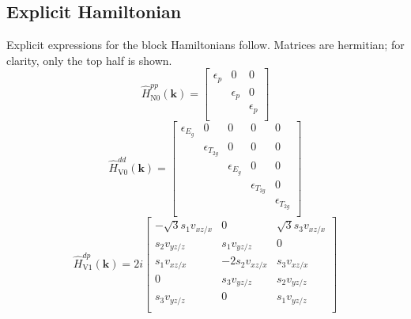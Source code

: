 \documentclass[twocolumn,showpacs,preprintnumbers,superscriptaddress,prb,floatfix,aps,10pt]{revtex4-1}
\renewcommand{\vec}[1]{\ensuremath{\mathbf{#1}}}
\newcommand*{\ham}{\hat{H}}
\begin{document}

\begin{widetext}

\section{Explicit Hamiltonian}

Explicit expressions for the block Hamiltonians follow. Matrices are hermitian; for clarity, only the top half is shown.
%
\begin{equation}
\label{eq:0pp}
\ham_{\textrm{N0}}^{pp}(\vec{k}) =
\begin{bmatrix}
\epsilon_{p} & 0 & 0 \\
  & \epsilon_{p} & 0 \\
  &   & \epsilon_{p} \\
\end{bmatrix}
\end{equation}
%
\begin{equation}
\label{eq:0dd}
\ham_{\textrm{V0}}^{dd}(\vec{k}) =
\begin{bmatrix}
 \epsilon_{E_g} & 0 & 0 & 0 & 0 \\
   & \epsilon_{T_{2g}} & 0 & 0 & 0 \\
   &   & \epsilon_{E_g} & 0 & 0 \\
   &   &   & \epsilon_{T_{2g}} & 0 \\
   &   &   &   & \epsilon_{T_{2g}} \\
\end{bmatrix}
\end{equation}
%
\begin{equation}
\ham_{\textrm{V1}}^{dp}(\vec{k}) = 2i
\begin{bmatrix}
-\sqrt{3} s_1 v_{xz/x} & 0              & \sqrt{3} s_3 v_{xz/x}  \\
 s_2 v_{yz/z}          &  s_1 v_{yz/z}  &      0                 \\
 s_1 v_{xz/x}          &-2 s_2 v_{xz/x} &  s_3 v_{xz/x}          \\
      0                &  s_3 v_{yz/z}  &  s_2 v_{yz/z}          \\
 s_3 v_{yz/z}          & 0              &  s_1 v_{yz/z}          \\
\end{bmatrix}

\end{equation}
\end{widetext}
\end{document}
